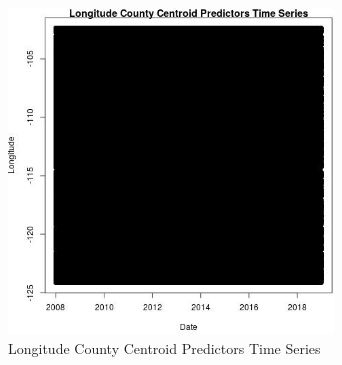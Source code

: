 \begin{figure} 
\centering  
\includegraphics[width=0.77\textwidth]{Code_Outputs/df_report_ML_predictors_CountyCentroid_Locations_Dates_2008-01-01to2018-12-31_LongitudevDate.jpg} 
\caption{\label{fig:df_report_ML_predictors_CountyCentroid_Locations_Dates_2008-01-01to2018-12-31LongitudevDate}Longitude County Centroid Predictors Time Series} 
\end{figure} 
 
